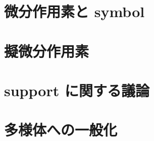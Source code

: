 \documentclass[dvipdfmx]{jsarticle}
\begin{document}
\section{微分作用素と symbol}


\section{擬微分作用素}


\section{support に関する議論}


\section{多様体への一般化}

\end{document}
